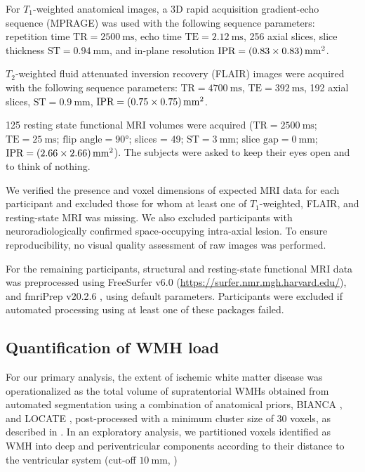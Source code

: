 For $T_1$-weighted anatomical images, a 3D rapid acquisition gradient-echo sequence (MPRAGE) was used with the following sequence parameters: repetition time $\text{TR} = \qty{2500}{\ms}$, echo time $\text{TE} = \qty{2.12}{\ms}$, 256 axial slices, slice thickness $\text{ST} = \qty{0.94}{\mm}$, and in-plane resolution  $\text{IPR} = \qtyproduct[product-units = bracket-power]{0.83 x 0.83}{\mm}$.

$T_2$-weighted fluid attenuated inversion recovery (FLAIR) images were acquired with the following sequence parameters: $\text{TR} = \qty{4700}{\ms}$, $\text{TE} = \qty{392}{\ms}$, \num{192} axial slices, $\text{ST} = \qty{0.9}{\mm}$, $\text{IPR} = \qtyproduct[product-units = bracket-power]{0.75 x 0.75}{\mm}$.

\num{125} resting state functional MRI volumes were acquired ($\text{TR} = \qty{2500}{\ms}$; $\text{TE} = \qty{25}{\ms}$; $\text{flip angle} = \ang[]{90}$; slices = \num{49}; $\text{ST} = \qty{3}{\mm}$; $\text{slice gap} = \qty{0}{\mm}$; $\text{IPR} = \qtyproduct[product-units = bracket-power]{2.66 x 2.66}{\mm}$).
The subjects were asked to keep their eyes open and to think of nothing.

We verified the presence and voxel dimensions of expected MRI data for each participant and excluded those for whom at least one of $T_1$-weighted, FLAIR, and resting-state MRI was missing. We also excluded participants with neuroradiologically confirmed space-occupying intra-axial lesion.
To ensure reproducibility, no visual quality assessment of raw images was performed.

For the remaining participants, structural and resting-state functional MRI data was preprocessed using FreeSurfer v6.0 (\url{https://surfer.nmr.mgh.harvard.edu/}), and fmriPrep v20.2.6 \citep{Esteban2019-sx}, using default parameters. Participants were excluded if automated processing using at least one of these packages failed.

\subsection{Quantification of WMH load}
For our primary analysis, the extent of ischemic white matter disease was operationalized as the total volume of supratentorial WMHs obtained from automated segmentation using a combination of anatomical priors, BIANCA \citep{Griffanti2016-dt}, and LOCATE \citep{Sundaresan2019-ww}, post-processed with a minimum cluster size of \num{30} voxels, as described in \citep{Schlemm2022-he}.
In an exploratory analysis, we partitioned voxels identified as WMH into deep and periventricular components according to their distance to the ventricular system (cut-off $\qty{10}{\mm}$, \citep{Griffanti2018-oa})

